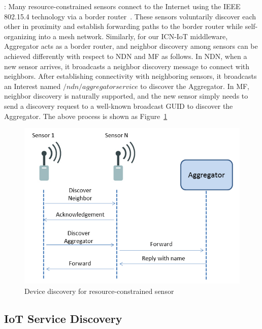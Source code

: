 \vspace{1mm}: Many resource-constrained sensors connect to the Internet using the IEEE 802.15.4 technology via a border router~\cite{hui2008ip}. These sensors voluntarily discover each other in proximity and establish forwarding paths to the border router while self-organizing into a mesh network. Similarly, for our ICN-IoT middleware,  Aggregator acts as a border router, and neighbor discovery among sensors can be achieved differently with respect to NDN and MF as follows. In NDN, when a new sensor arrives, it broadcasts a neighbor discovery message to connect with neighbors. After establishing connectivity with neighboring sensors, it broadcasts an Interest named $/ndn/aggregatorservice$ to discover the Aggregator. In MF, neighbor discovery is naturally supported, and the new sensor simply needs to send a discovery request to a well-known broadcast GUID to discover the Aggregator. %
The above process is shown as Figure~\ref{fig:device_dis}
\begin{figure}
\includegraphics[width=\columnwidth]{figure/device_discovery.png}
\caption{\label{fig:device_dis}Device discovery for resource-constrained sensor}
\end{figure}



\subsection{IoT Service Discovery}

